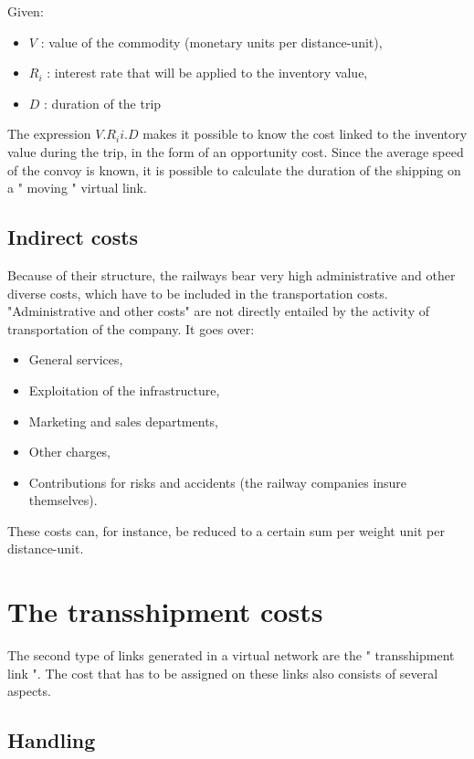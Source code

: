 Given:

\begin{itemize}
\item $V$ : value of the commodity (monetary units per distance-unit),
\item $R_i$ : interest rate that will be applied to the inventory value,
\item $D$ : duration of the trip
\end{itemize}


The expression $V.R_ii.D$ makes it possible to know the cost linked to the
inventory value during the trip, in the form of an opportunity cost.  Since
the average speed of the convoy is known, it is possible to calculate the
duration of the shipping on a " moving " virtual link.




\subsection{Indirect costs}

Because of their structure, the railways bear very high administrative and other diverse
costs, which have to be included in the transportation costs.  "Administrative and other costs"
are not directly entailed by the activity of transportation of the company.
It goes over:


\begin{itemize}
\item General services,
\item Exploitation of the infrastructure,
\item Marketing and sales departments,
\item Other charges,
\item Contributions for risks and accidents (the railway companies insure themselves).
\end{itemize}

These costs can, for instance, be reduced to a certain sum per weight unit per
distance-unit.



\section{The transshipment costs}

The second type of links generated in a virtual network are the " transshipment
link ".  The cost that has to be assigned on these links also consists of
several aspects.


\subsection{Handling}

